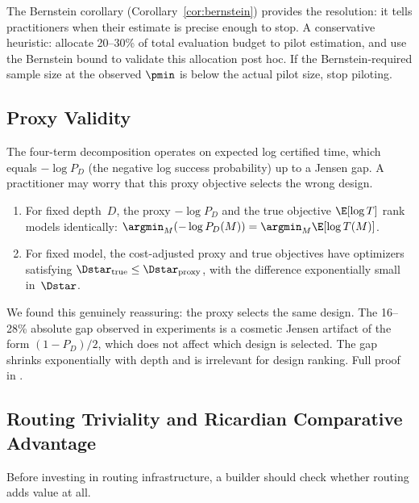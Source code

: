 The Bernstein corollary (Corollary~\ref{cor:bernstein}) provides the resolution: it tells practitioners when their estimate is precise enough to stop.
A conservative heuristic: allocate 20--30\% of total evaluation budget to pilot estimation, and use the Bernstein bound to validate this allocation post hoc.
If the Bernstein-required sample size at the observed $\pmin$ is below the actual pilot size, stop piloting.

\subsection{Proxy Validity}
\label{sec:proxy-validity}

The four-term decomposition operates on expected log certified time, which equals $-\log P_D$ (the negative log success probability) up to a Jensen gap.
A practitioner may worry that this proxy objective selects the wrong design.

\begin{theorem}
\label{thm:proxy-validity}
\begin{enumerate}[label=(\alph*)]
  \item For fixed depth~$D$, the proxy $-\log P_D$ and the true objective $\E[\log T]$ rank models identically: $\argmin_M (-\log P_D(M)) = \argmin_M \E[\log T(M)]$.
  \item For fixed model, the cost-adjusted proxy and true objectives have optimizers satisfying $\Dstar_{\mathrm{true}} \le \Dstar_{\mathrm{proxy}}$, with the difference exponentially small in~$\Dstar$.
\end{enumerate}
\end{theorem}

We found this genuinely reassuring: the proxy selects the same design.
The 16--28\% absolute gap observed in experiments is a cosmetic Jensen artifact of the form $(1-P_D)/2$, which does not affect which design is selected.
The gap shrinks exponentially with depth and is irrelevant for design ranking.
Full proof in .

\subsection{Routing Triviality and Ricardian Comparative Advantage}
\label{sec:routing-triviality}

Before investing in routing infrastructure, a builder should check whether routing adds value at all.

